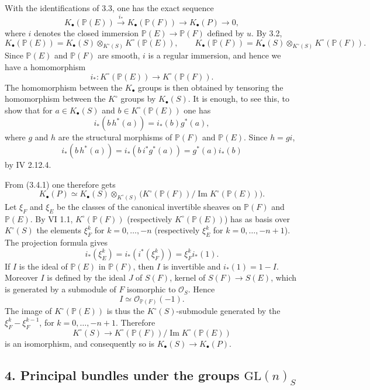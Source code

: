 With the identifications of 3.3, one has the exact sequence
\[
 K_\bullet(\mathbb P(E))\xrightarrow{i_*}K_\bullet(\mathbb P(F))\longrightarrow K_\bullet(P)\longrightarrow 0,
\tag{3.4.1}
\]
where $i$ denotes the closed immersion $\mathbb P(E)\to\mathbb P(F)$ defined by $u$. By 3.2,
\[
 K_\bullet(\mathbb P(E))=K_\bullet(S)\otimes_{K^\circ(S)}K^\circ(\mathbb P(E)),
\qquad
 K_\bullet(\mathbb P(F))=K_\bullet(S)\otimes_{K^\circ(S)}K^\circ(\mathbb P(F)).
\]
Since $\mathbb P(E)$ and $\mathbb P(F)$ are smooth, $i$ is a regular immersion, and hence we have a homomorphism
\[
 i_*:K^\circ(\mathbb P(E))\longrightarrow K^\circ(\mathbb P(F)).
\]
The homomorphism between the $K_\bullet$ groups is then obtained by tensoring the homomorphism between the $K^\circ$ groups by $K_\bullet(S)$. It is enough, to see this, to show that for $a\in K_\bullet(S)$ and $b\in K^\circ(\mathbb P(E))$ one has
\[
 i_*(b\,h^*(a))=i_*(b)g^*(a),
\]
where $g$ and $h$ are the structural morphisms of $\mathbb P(F)$ and $\mathbb P(E)$. Since $h=gi$,
\[
 i_*(b\,h^*(a))=i_*(b\,i^*g^*(a))=g^*(a)i_*(b)
\]
by IV 2.12.4.

From (3.4.1) one therefore gets
\[
 K_\bullet(P)\simeq K_\bullet(S)\otimes_{K^\circ(S)}
 \bigl(K^\circ(\mathbb P(F))/\operatorname{Im}K^\circ(\mathbb P(E))\bigr).
\]
Let $\xi_F$ and $\xi_E$ be the classes of the canonical invertible sheaves on $\mathbb P(F)$ and $\mathbb P(E)$. By VI 1.1, $K^\circ(\mathbb P(F))$ (respectively $K^\circ(\mathbb P(E))$) has as basis over $K^\circ(S)$ the elements $\xi_F^k$ for $k=0,\ldots,-n$ (respectively $\xi_E^k$ for $k=0,\ldots,-n+1$). The projection formula gives
\[
 i_*(\xi_E^k)=i_*(i^*(\xi_F^k))=\xi_F^k i_*(1).
\]
If $I$ is the ideal of $\mathbb P(E)$ in $\mathbb P(F)$, then $I$ is invertible and $i_*(1)=1-I$. Moreover $I$ is defined by the ideal $J$ of $S(F)$, kernel of $S(F)\to S(E)$, which is generated by a submodule of $F$ isomorphic to $\mathcal O_S$. Hence
\[
 I\simeq \mathcal O_{\mathbb P(F)}(-1).
\]
The image of $K^\circ(\mathbb P(E))$ is thus the $K^\circ(S)$-submodule generated by the $\xi_F^k-\xi_F^{k-1}$, for $k=0,\ldots,-n+1$. Therefore
\[
 K^\circ(S)\longrightarrow K^\circ(\mathbb P(F))/\operatorname{Im}K^\circ(\mathbb P(E))
\]
is an isomorphism, and consequently so is $K_\bullet(S)\to K_\bullet(P)$.

\subsection*{4. Principal bundles under the groups $\mathrm{GL}(n)_S$}

